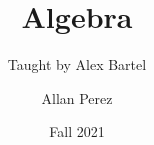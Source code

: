 \documentclass[11pt]{scrartcl}
\title{Algebra}
\subtitle{Taught by Alex Bartel}
\author{Allan Perez}
\date{Fall 2021}
\begin{document}
 \maketitle

\tableofcontents
\newpage
\listoftheorems
\newpage

































\end{document}

